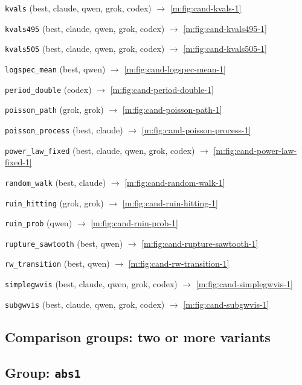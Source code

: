 \texttt{kvals}  (best, claude, qwen, grok, codex) \quad $\rightarrow$ \cref{m:fig:cand-kvals-1}\par
\texttt{kvals495}  (best, claude, qwen, grok, codex) \quad $\rightarrow$ \cref{m:fig:cand-kvals495-1}\par
\texttt{kvals505}  (best, claude, qwen, grok, codex) \quad $\rightarrow$ \cref{m:fig:cand-kvals505-1}\par
\texttt{logspec\_mean}  (best, qwen) \quad $\rightarrow$ \cref{m:fig:cand-logspec-mean-1}\par
\texttt{period\_double}  (codex) \quad $\rightarrow$ \cref{m:fig:cand-period-double-1}\par
\texttt{poisson\_path}  (grok, grok) \quad $\rightarrow$ \cref{m:fig:cand-poisson-path-1}\par
\texttt{poisson\_process}  (best, claude) \quad $\rightarrow$ \cref{m:fig:cand-poisson-process-1}\par
\texttt{power\_law\_fixed}  (best, claude, qwen, grok, codex) \quad $\rightarrow$ \cref{m:fig:cand-power-law-fixed-1}\par
\texttt{random\_walk}  (best, claude) \quad $\rightarrow$ \cref{m:fig:cand-random-walk-1}\par
\texttt{ruin\_hitting}  (grok, grok) \quad $\rightarrow$ \cref{m:fig:cand-ruin-hitting-1}\par
\texttt{ruin\_prob}  (qwen) \quad $\rightarrow$ \cref{m:fig:cand-ruin-prob-1}\par
\texttt{rupture\_sawtooth}  (best, qwen) \quad $\rightarrow$ \cref{m:fig:cand-rupture-sawtooth-1}\par
\texttt{rw\_transition}  (best, qwen) \quad $\rightarrow$ \cref{m:fig:cand-rw-transition-1}\par
\texttt{simplegwvis}  (best, claude, qwen, grok, codex) \quad $\rightarrow$ \cref{m:fig:cand-simplegwvis-1}\par
\texttt{subgwvis}  (best, claude, qwen, grok, codex) \quad $\rightarrow$ \cref{m:fig:cand-subgwvis-1}\par
\endgroup

\subsection*{Comparison groups: two or more variants}

\subsection*{Group: \texttt{abs1}}

